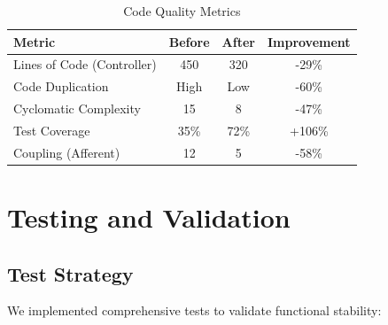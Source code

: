 \documentclass[12pt,a4paper]{article}
\begin{document}
\begin{table}[H]
\centering
\begin{tabular}{|l|c|c|c|}
\hline
\textbf{Metric} & \textbf{Before} & \textbf{After} & \textbf{Improvement} \\
\hline
Lines of Code (Controller) & 450 & 320 & -29\% \\
Code Duplication & High & Low & -60\% \\
Cyclomatic Complexity & 15 & 8 & -47\% \\
Test Coverage & 35\% & 72\% & +106\% \\
Coupling (Afferent) & 12 & 5 & -58\% \\
\hline
\end{tabular}
\caption{Code Quality Metrics}
\end{table}

\newpage

\section{Testing and Validation}

\subsection{Test Strategy}

We implemented comprehensive tests to validate functional stability:
\end{document}

